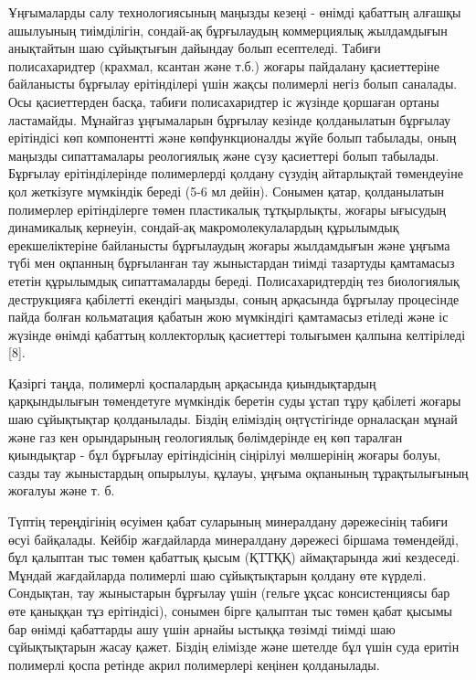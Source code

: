 \begin{multicols}{2}
Ұңғымаларды салу технологиясының маңызды кезеңі - өнімді қабаттың
алғашқы ашылуының тиімділігін, сондай-ақ бұрғылаудың коммерциялық
жылдамдығын анықтайтын шаю сұйықтығын дайындау болып есептеледі. Табиғи
полисахаридтер (крахмал, ксантан және т.б.) жоғары пайдалану
қасиеттеріне байланысты бұрғылау ерітінділері үшін жақсы полимерлі негіз
болып саналады. Осы қасиеттерден басқа, табиғи полисахаридтер іс жүзінде
қоршаған ортаны ластамайды. Мұнайгаз ұңғымаларын бұрғылау кезінде
қолданылатын бұрғылау ерітіндісі көп компонентті және көпфункционалды
жүйе болып табылады, оның маңызды сипаттамалары реологиялық және сүзу
қасиеттері болып табылады. Бұрғылау ерітінділерінде полимерлерді қолдану
сүзудің айтарлықтай төмендеуіне қол жеткізуге мүмкіндік береді (5-6 мл
дейін). Сонымен қатар, қолданылатын полимерлер ерітінділерге төмен
пластикалық тұтқырлықты, жоғары ығысудың динамикалық кернеуін, сондай-ақ
макромолекулалардың құрылымдық ерекшеліктеріне байланысты бұрғылаудың
жоғары жылдамдығын және ұңғыма түбі мен оқпанның бұрғыланған тау
жыныстардан тиімді тазартуды қамтамасыз ететін құрылымдық сипаттамаларды
береді. Полисахаридтердің тез биологиялық деструкцияға қабілетті
екендігі маңызды, соның арқасында бұрғылау процесінде пайда болған
кольматация қабатын жою мүмкіндігі қамтамасыз етіледі және іс жүзінде
өнімді қабаттың коллекторлық қасиеттері толығымен қалпына келтіріледі
{[}8{]}.

Қазіргі таңда, полимерлі қоспалардың арқасында қиындықтардың
қарқындылығын төмендетуге мүмкіндік беретін суды ұстап тұру қабілеті
жоғары шаю сұйықтықтар қолданылады. Біздің еліміздің оңтүстігінде
орналасқан мұнай және газ кен орындарының геологиялық бөлімдерінде ең
көп таралған қиындықтар - бұл бұрғылау ерітіндісінің сіңірілуі
мөлшерінің жоғары болуы, сазды тау жыныстардың опырылуы, құлауы, ұңғыма
оқпанының тұрақтылығының жоғалуы және т. б.

Түптің тереңдігінің өсуімен қабат суларының минералдану дәрежесінің
табиғи өсуі байқалады. Кейбір жағдайларда минералдану дәрежесі біршама
төмендейді, бұл қалыптан тыс төмен қабаттық қысым (ҚТТҚҚ) аймақтарында
жиі кездеседі. Мұндай жағдайларда полимерлі шаю сұйықтықтарын қолдану
өте күрделі. Сондықтан, тау жыныстарын бұрғылау үшін (гельге ұқсас
консистенциясы бар өте қаныққан тұз ерітіндісі), сонымен бірге қалыптан
тыс төмен қабат қысымы бар өнімді қабаттарды ашу үшін арнайы ыстыққа
төзімді тиімді шаю сұйықтықтарын жасау қажет. Біздің елімізде және
шетелде бұл үшін суда еритін полимерлі қоспа ретінде акрил полимерлері
кеңінен қолданылады.


\end{multicols}
